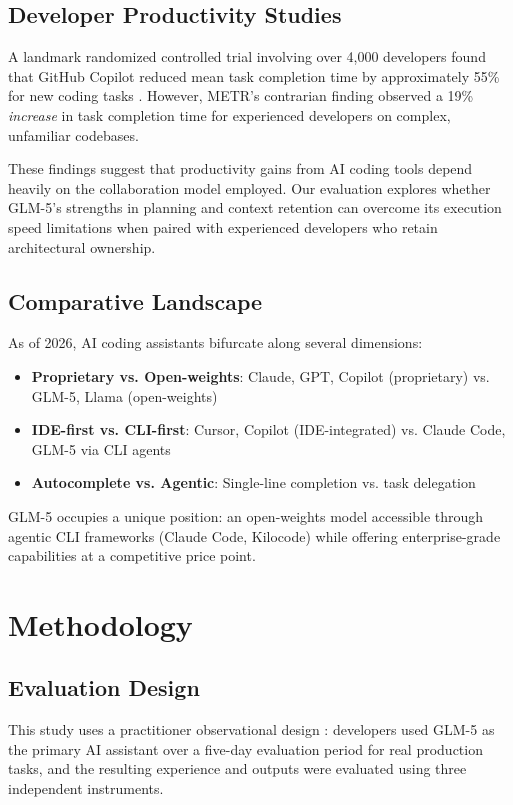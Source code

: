\documentclass[conference]{IEEEtran}
\begin{document}
\subsection{Developer Productivity Studies}
A landmark randomized controlled trial involving over 4,000 developers found that GitHub Copilot reduced mean task completion time by approximately 55\% for new coding tasks \cite{peng2023copilot}. However, METR's contrarian finding \cite{metr2025} observed a 19\% \textit{increase} in task completion time for experienced developers on complex, unfamiliar codebases.

These findings suggest that productivity gains from AI coding tools depend heavily on the collaboration model employed. Our evaluation explores whether GLM-5's strengths in planning and context retention can overcome its execution speed limitations when paired with experienced developers who retain architectural ownership.

\subsection{Comparative Landscape}
As of 2026, AI coding assistants bifurcate along several dimensions:

\begin{itemize}
    \item \textbf{Proprietary vs. Open-weights}: Claude, GPT, Copilot (proprietary) vs. GLM-5, Llama (open-weights)
    \item \textbf{IDE-first vs. CLI-first}: Cursor, Copilot (IDE-integrated) vs. Claude Code, GLM-5 via CLI agents
    \item \textbf{Autocomplete vs. Agentic}: Single-line completion vs. task delegation
\end{itemize}

GLM-5 occupies a unique position: an open-weights model accessible through agentic CLI frameworks (Claude Code, Kilocode) while offering enterprise-grade capabilities at a competitive price point.

\section{Methodology}

\subsection{Evaluation Design}
This study uses a practitioner observational design \cite{creswell2018mixed}: developers used GLM-5 as the primary AI assistant over a five-day evaluation period for real production tasks, and the resulting experience and outputs were evaluated using three independent instruments.
\end{document}
